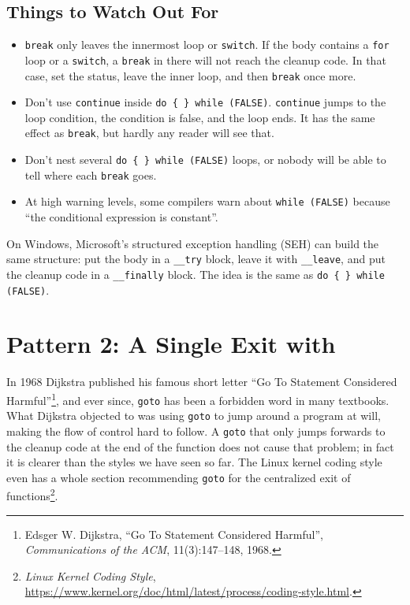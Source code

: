 \subsection{Things to Watch Out For}

\begin{itemize}
  \item \texttt{break} only leaves the innermost loop or \texttt{switch}. If the body contains a \texttt{for} loop or a \texttt{switch}, a \texttt{break} in there will not reach the cleanup code. In that case, set the status, leave the inner loop, and then \texttt{break} once more.
  \item Don't use \texttt{continue} inside \texttt{do \{ \} while (FALSE)}. \texttt{continue} jumps to the loop condition, the condition is false, and the loop ends. It has the same effect as \texttt{break}, but hardly any reader will see that.
  \item Don't nest several \texttt{do \{ \} while (FALSE)} loops, or nobody will be able to tell where each \texttt{break} goes.
  \item At high warning levels, some compilers warn about \texttt{while (FALSE)} because ``the conditional expression is constant''.
\end{itemize}

On Windows, Microsoft's structured exception handling (SEH) can build the same structure: put the body in a \texttt{\_\_try} block, leave it with \texttt{\_\_leave}, and put the cleanup code in a \texttt{\_\_finally} block. The idea is the same as \texttt{do \{ \} while (FALSE)}.

\section{Pattern 2: A Single Exit with \texorpdfstring{}{goto}}
\label{sec:goto}

In 1968 Dijkstra published his famous short letter ``Go To Statement Considered Harmful''\footnote{Edsger W. Dijkstra, ``Go To Statement Considered Harmful'', \emph{Communications of the ACM}, 11(3):147--148, 1968.}, and ever since, \texttt{goto} has been a forbidden word in many textbooks. What Dijkstra objected to was using \texttt{goto} to jump around a program at will, making the flow of control hard to follow. A \texttt{goto} that only jumps forwards to the cleanup code at the end of the function does not cause that problem; in fact it is clearer than the styles we have seen so far. The Linux kernel coding style even has a whole section recommending \texttt{goto} for the centralized exit of functions\footnote{\emph{Linux Kernel Coding Style}, \url{https://www.kernel.org/doc/html/latest/process/coding-style.html}.}.


